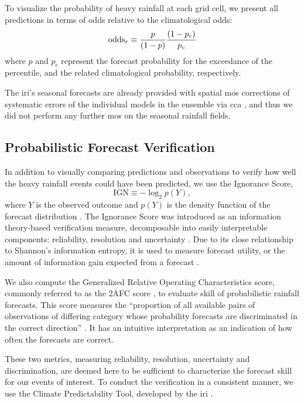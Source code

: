 \documentclass[twocol]{ametsoc}
\begin{document}
To visualize the probability of heavy rainfall at each grid cell, we present all predictions in terms of odds relative to the climatological odds:
\begin{equation} \label{eq:odds-ratio}
	\text{odds}_{r} \equiv \frac{p}{\qty(1 - p)} \frac{\qty(1 - p_c)}{p_c}
\end{equation}
where $p$ and $p_c$ represent the forecast probability for the exceedance of the  percentile, and the related climatological probability, respectively.

The \gls{iri}'s seasonal forecasts are already provided with spatial \gls{mos} corrections of systematic errors of the individual models in the ensemble via \gls{cca} \citep{Barnston2010}, and thus we did not perform any further \gls{mos} on the seasonal rainfall fields.

\subsection{Probabilistic Forecast Verification}

In addition to visually comparing predictions and observations to verify how well the heavy rainfall events could have been predicted, we use the Ignorance Score,
\begin{equation}\label{eq:ignorance}
	\text{IGN} \equiv - \log_2 p(Y),
\end{equation}
where $Y$ is the observed outcome and $p(Y)$ is the density function of the forecast distribution \citep{Good1952,Roulston2002,Brocker2007}.
The Ignorance Score was introduced as an information theory-based verification measure,  decomposable into easily interpretable components: reliability, resolution and uncertainty \citep{Weijs2010}.
Due to its close relationship to Shannon's information entropy, it is used to measure forecast utility, or the amount of information gain expected from a forecast \citep{Roulston2002}.

We also compute the Generalized Relative Operating Characteristics score, commonly referred to as the 2AFC score \citep{Mason2009}, to evaluate skill of probabilistic rainfall forecasts.
This score measures the ``proportion of all available pairs of observations of differing category whose probability forecasts are discriminated in the correct direction'' \citep{Mason2009}.
It has an intuitive interpretation as an indication of how often the forecasts are correct.

These two metrics, measuring reliability, resolution, uncertainty and discrimination, are deemed here to be sufficient to characterize the forecast skill for our events of interest.
To conduct the verification in a consistent manner, we use the Climate Predictability Tool, developed by the \gls{iri} \citep{Mason2017}.
\end{document}
